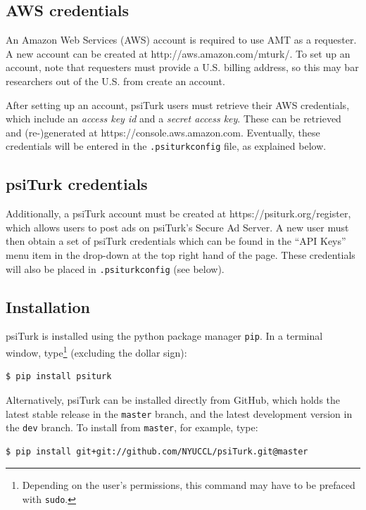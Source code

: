 \documentclass[twocolumn]{svjour3}          %
\newcommand{\psiturk}[0]{\textsf{psiTurk}}
\begin{document}
\subsection{AWS credentials}
An Amazon Web Services (AWS) account is required to use AMT as a requester. A new account can be created at \textsf{http://aws.amazon.com/mturk/}. 
To set up an account, note that requesters
must provide a U.S. billing address, so this may bar researchers out of the U.S. from create an account. 

After setting up an account, \psiturk{} users must retrieve their AWS credentials, which include an \emph{access key id} and a
\emph{secret access key}. These can be retrieved and (re-)generated at \textsf{https://console.aws.amazon.com}.
Eventually, these credentials will be entered in the \texttt{.psiturkconfig} file, as explained below.


\subsection{\psiturk{} credentials}
Additionally, a \psiturk{} account must be created at \textsf{https://psiturk.org/register}, which allows users to 
post ads on \psiturk{}'s Secure Ad Server. A new user must then obtain a set of \psiturk{} credentials which can be found in 
the ``API Keys'' menu item in the drop-down at the top right hand of the page.
These credentials will also be placed in \texttt{.psiturkconfig} (see below).

\subsection{Installation}
\psiturk{} is installed using the python package manager \texttt{pip}. In a terminal window, type\footnote{Depending on the user's permissions, this command may have to be prefaced with \texttt{sudo}.} (excluding the dollar sign):

\begin{lstlisting}
$ pip install psiturk
\end{lstlisting}

Alternatively, \psiturk{} can be installed directly from GitHub, which holds the latest stable
release in the \texttt{master} branch, and the latest development version in the \texttt{dev} branch. 
To install from \texttt{master}, for example, type:

\begin{lstlisting}
$ pip install git+git://github.com/NYUCCL/psiTurk.git@master
\end{lstlisting}
\end{document}
